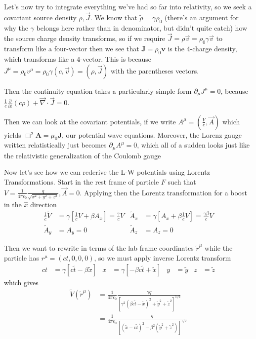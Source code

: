 \documentclass[10pt]{report}
\newcommand{\pd}[2]{\frac{\partial #1}{\partial#2}}
\begin{document}
Let's now try to integrate everything we've had so far into relativity, so we seek a covariant source density $\rho, \vec{J}$. We know that $\tilde{\rho} = \gamma \rho_0$ (there's an argument for why the $\gamma$ belongs here rather than in denominator, but didn't quite catch) how the source charge density transforms, so if we require $\vec{J} = \rho \vec{v} = \rho_0 \gamma \vec{v}$ to transform like a four-vector then we see that $\mathbf{J} = \rho_0 \mathbf{v}$ is the 4-charge density, which transforms like a 4-vector. This is because $J^\mu = \rho_0 v^\mu = \rho_0\gamma(c,\vec{v}) = (\rho,\vec{J})$ with the parentheses vectors.

Then the continuity equation takes a particularly simple form $\partial_\mu J^\mu = 0$, because $\frac{1}{c}\pd{}{t}(c\rho) + \vec{\nabla} \cdot \vec{J} = 0$.

Then we can look at the covariant potentials, if we write $A^\mu = \left( \frac{V}{c}, \vec{A} \right)$ which yields $\Box^2 \mathbf{A} = \mu_0 \mathbf{J}$, our potential wave equations. Moreover, the Lorenz gauge written relatistically just becomes $\partial_\mu A^\mu = 0$, which all of a sudden looks just like the relativistic generalization of the Coulomb gauge

Now let's see how we can rederive the L-W potentials using Lorentz Transformations. Start in the rest frame of particle $F$ such that $V = \frac{1}{4\pi\epsilon_0}\frac{q}{\sqrt{x^2 + y^2 + z^2}}, \vec{A} = 0$. Applying then the Lorentz transformation for a boost in the $\hat{x}$ direction
\begin{align}
    \frac{1}{c}\tilde{V} &= \gamma\left[ \frac{1}{c}V + \beta A_x \right] = \frac{\gamma}{c}V & \tilde{A}_x &= \gamma\left[ A_x + \beta\frac{1}{c}V \right] = \frac{\gamma \beta}{c}V\\
    \tilde{A}_y &= A_y = 0 & \tilde{A}_z &= A_z = 0
\end{align}

Then we want to rewrite in terms of the lab frame coordinates $\tilde{r}^\mu$ while the particle has $r^\mu = (ct, 0, 0, 0)$, so we must apply inverse Lorentz transform
\begin{align}
    ct &= \gamma\left[ c\tilde{t} - \beta \tilde{x} \right] & x &= \gamma\left[ -\beta c\tilde{t} + \tilde{x} \right] & y &= \tilde{y} & z &= \tilde{z}
\end{align}
which gives
\begin{align}
    \tilde{V}(\tilde{r}^\mu) &= \frac{1}{4\pi\epsilon_0}\frac{\gamma q}{\left[ \gamma^2(\beta c\tilde{t} - \tilde{x})^2 + \tilde{y}^2 + \tilde{z}^2 \right]^{1/2}}\\
    &= \frac{1}{4\pi\epsilon_0}\frac{q}{\left[ \left( \tilde{x} - v\tilde{t} \right)^2 - \beta^2 (\tilde{y}^2 + \tilde{z}^2) \right]^{1/2}}
\end{align}
\end{document}
